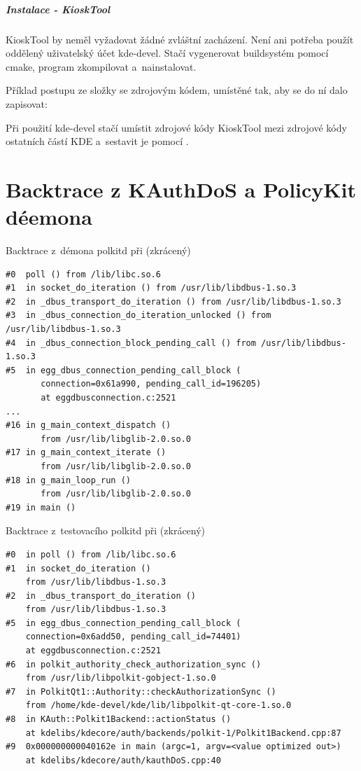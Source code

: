 \paragraph{Instalace - KioskTool}
KioskTool by neměl vyžadovat žádné zvláštní zacházení. Není ani potřeba použít oddělený uživatelský účet kde-devel. Stačí vygenerovat buildsystém pomocí cmake, program zkompilovat a~nainstalovat.

Příklad postupu ze složky se zdrojovým kódem, umístěné tak, aby se do ní dalo zapisovat:

\noindent
{}

\noindent
{}

\noindent
{}

\noindent
{}

Při použití kde-devel stačí umístit zdrojové kódy KioskTool mezi zdrojové kódy ostatních částí KDE a~sestavit je pomocí .
\chapter{Backtrace z KAuthDoS a PolicyKit déemona}
\begin{mylisting}
\caption{Backtrace z~démona polkitd při  (zkrácený)}
\label{btrac1}
\begin{lstlisting}
#0  poll () from /lib/libc.so.6
#1  in socket_do_iteration () from /usr/lib/libdbus-1.so.3
#2  in _dbus_transport_do_iteration () from /usr/lib/libdbus-1.so.3
#3  in _dbus_connection_do_iteration_unlocked () from /usr/lib/libdbus-1.so.3
#4  in _dbus_connection_block_pending_call () from /usr/lib/libdbus-1.so.3
#5  in egg_dbus_connection_pending_call_block (
       connection=0x61a990, pending_call_id=196205)
       at eggdbusconnection.c:2521
...      
#16 in g_main_context_dispatch ()
       from /usr/lib/libglib-2.0.so.0
#17 in g_main_context_iterate ()
       from /usr/lib/libglib-2.0.so.0
#18 in g_main_loop_run ()
       from /usr/lib/libglib-2.0.so.0
#19 in main ()
\end{lstlisting}
\end{mylisting}

\begin{mylisting}
\caption{Backtrace z~testovacího polkitd při  (zkrácený)}
\label{btrac2}
\begin{lstlisting}
#0  in poll () from /lib/libc.so.6
#1  in socket_do_iteration ()
    from /usr/lib/libdbus-1.so.3
#2  in _dbus_transport_do_iteration ()
    from /usr/lib/libdbus-1.so.3
#5  in egg_dbus_connection_pending_call_block (
    connection=0x6add50, pending_call_id=74401)
    at eggdbusconnection.c:2521
#6  in polkit_authority_check_authorization_sync ()
    from /usr/lib/libpolkit-gobject-1.so.0
#7  in PolkitQt1::Authority::checkAuthorizationSync ()
    from /home/kde-devel/kde/lib/libpolkit-qt-core-1.so.0
#8  in KAuth::Polkit1Backend::actionStatus ()
    at kdelibs/kdecore/auth/backends/polkit-1/Polkit1Backend.cpp:87
#9  0x000000000040162e in main (argc=1, argv=<value optimized out>)
    at kdelibs/kdecore/auth/kauthDoS.cpp:40 
\end{lstlisting}
\end{mylisting}

